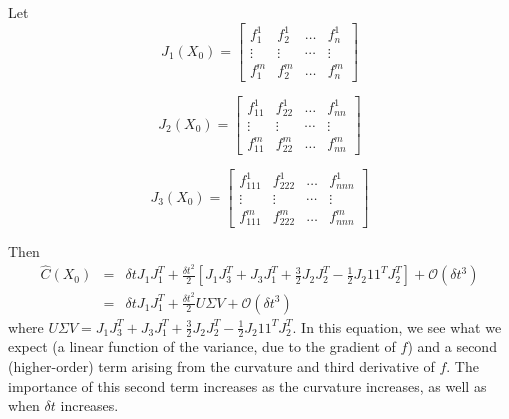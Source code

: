 \documentclass[12pt]{article}
\begin{document}
Let 
\begin{equation}
J_1(X_0) = \begin{bmatrix}
f_1^1 & f_2^1 & \dots & f_n^1 \\
\vdots & \vdots & \cdots & \vdots \\
f_1^m & f_2^m & \dots & f_n^m
\end{bmatrix}
\end{equation}

\begin{equation}
J_2(X_0) = \begin{bmatrix}
f_{11}^1 & f_{22}^1 & \dots & f_{nn}^1 \\
\vdots & \vdots & \cdots & \vdots \\
f_{11}^m & f_{22}^m & \dots & f_{nn}^m
\end{bmatrix}
\end{equation}

\begin{equation}
J_3(X_0) = \begin{bmatrix}
f_{111}^1 & f_{222}^1 & \dots & f_{nnn}^1 \\
\vdots & \vdots & \cdots & \vdots \\
f_{111}^m & f_{222}^m & \dots & f_{nnn}^m
\end{bmatrix}
\end{equation}

Then
\begin{eqnarray}
\hat{C}(X_0) &=& \delta t J_1 J_1^T 
+ \frac{\delta t^2}{2} \left[ J_1 J_3^T + J_3 J_1^T  
+ \frac{3}{2} J_2 J_2^T 
-\frac{1 }{2} J_2 1 1^T J_2^T \right]
+ \mathcal{O} (\delta t^3) \\
&=& \delta t J_1 J_1^T 
+ \frac{\delta t^2}{2} U \Sigma V
+ \mathcal{O} (\delta t^3)
\end{eqnarray}
%
where $U \Sigma V = J_1 J_3^T + J_3 J_1^T + \frac{3}{2} J_2 J_2^T -\frac{1 }{2} J_2 1 1^T J_2^T $.
%
In this equation, we see what we expect (a linear function of the variance, due to the gradient of $f$) and a second (higher-order) term arising from the curvature and third derivative of $f$.
%
The importance of this second term increases as the curvature increases, as well as when $\delta t$ increases. 
\end{document}

